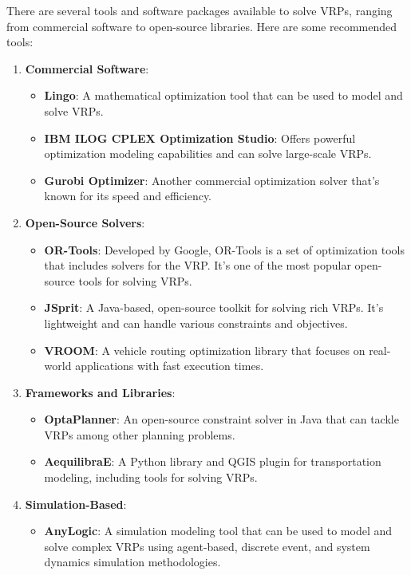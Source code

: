  There are several tools and software packages available to solve VRPs, ranging from commercial software to open-source libraries. Here are some recommended tools:

\begin{enumerate}
    \item \textbf{Commercial Software}:
    \begin{itemize}
        \item \textbf{Lingo}: A mathematical optimization tool that can be used to model and solve VRPs.
        \item \textbf{IBM ILOG CPLEX Optimization Studio}: Offers powerful optimization modeling capabilities and can solve large-scale VRPs.
        \item \textbf{Gurobi Optimizer}: Another commercial optimization solver that's known for its speed and efficiency.
    \end{itemize}
    
    \item \textbf{Open-Source Solvers}:
    \begin{itemize}
        \item \textbf{OR-Tools}: Developed by Google, OR-Tools is a set of optimization tools that includes solvers for the VRP. It's one of the most popular open-source tools for solving VRPs.
        \item \textbf{JSprit}: A Java-based, open-source toolkit for solving rich VRPs. It's lightweight and can handle various constraints and objectives.
        \item \textbf{VROOM}: A vehicle routing optimization library that focuses on real-world applications with fast execution times.
    \end{itemize}
    
    \item \textbf{Frameworks and Libraries}:
    \begin{itemize}
        \item \textbf{OptaPlanner}: An open-source constraint solver in Java that can tackle VRPs among other planning problems.
        \item \textbf{AequilibraE}: A Python library and QGIS plugin for transportation modeling, including tools for solving VRPs.
    \end{itemize}
    
    \item \textbf{Simulation-Based}:
    \begin{itemize}
        \item \textbf{AnyLogic}: A simulation modeling tool that can be used to model and solve complex VRPs using agent-based, discrete event, and system dynamics simulation methodologies.
    \end{itemize}
    

\end{enumerate}
